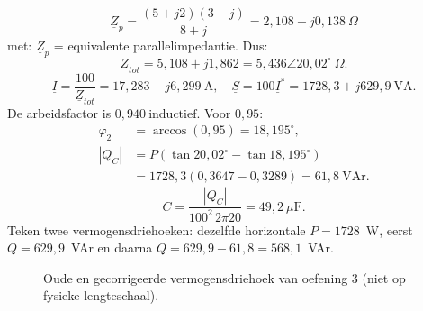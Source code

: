 \documentclass[a4paper,11pt]{article}
\begin{document}
\begin{oefenblok}
    \[
        \underline{Z}_p=\frac{(5+j2)(3-j)}{8+j}=2{,}108-j0{,}138\ \Omega
    \]
    met: $\underline{Z}_p$ = equivalente parallelimpedantie. Dus:
    \[
        \underline{Z}_{tot}=5{,}108+j1{,}862=5{,}436\angle20{,}02^\circ\ \Omega.
    \]
    \[
        \underline{I}=\frac{100}{\underline{Z}_{tot}}=17{,}283-j6{,}299\ \text{A},\quad
        \underline{S}=100\underline{I}^{*}=1728{,}3+j629{,}9\ \text{VA}.
    \]
    De arbeidsfactor is $\boxed{0{,}940\ \text{inductief}}$. Voor $0{,}95$:
    \[
        \begin{aligned}
            \varphi_2 & =\arccos(0{,}95)=18{,}195^\circ,                    \\
            |Q_C|     & =P\left(\tan20{,}02^\circ-\tan18{,}195^\circ\right) \\
                      & =1728{,}3(0{,}3647-0{,}3289)=61{,}8\ \text{VAr}.
        \end{aligned}
    \]
    \[
        \boxed{C=\frac{|Q_C|}{100^2\,2\pi20}=49{,}2\ \mu\text{F}}.
    \]
    Teken twee vermogensdriehoeken: dezelfde horizontale $P=1728$~W, eerst
    $Q=629{,}9$~VAr en daarna $Q=629{,}9-61{,}8=568{,}1$~VAr.
    \begin{figure}[H]\centering
        \caption{Oude en gecorrigeerde vermogensdriehoek van oefening 3 (niet op fysieke lengteschaal).}
    \end{figure}\FloatBarrier
\end{oefenblok}
\end{document}
